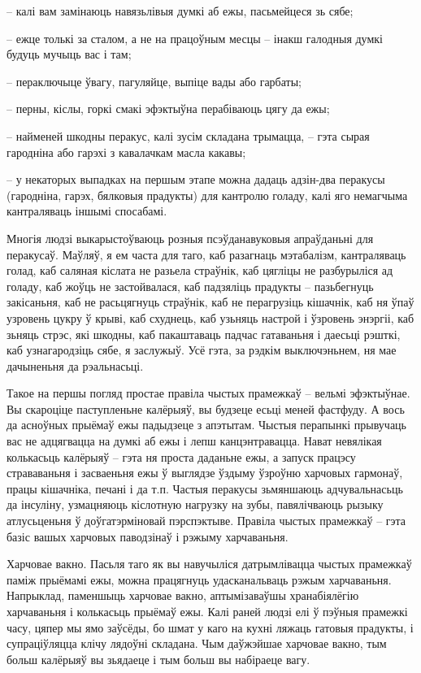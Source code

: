 – калі вам замінаюць навязьлівыя думкі аб ежы, пасьмейцеся зь сябе;

– ежце толькі за сталом, а не на працоўным месцы – інакш галодныя думкі будуць мучыць вас і там;

– пераключыце ўвагу, пагуляйце, выпіце вады або гарбаты;

– перны, кіслы, горкі смакі эфэктыўна перабіваюць цягу да ежы;

– найменей шкодны перакус, калі зусім складана трымацца, – гэта сырая гародніна або гарэхі з кавалачкам масла какавы;

– у некаторых выпадках на першым этапе можна дадаць адзін-два перакусы (гародніна, гарэх, бялковыя прадукты) для кантролю голаду, калі яго немагчыма кантраляваць іншымі спосабамі.

Многія людзі выкарыстоўваюць розныя псэўданавуковыя апраўданьні для перакусаў. Маўляў, я ем часта для таго, каб разагнаць мэтабалізм, кантраляваць голад, каб саляная кіслата не разьела страўнік, каб цягліцы не разбурыліся ад голаду, каб жоўць не застойвалася, каб падзяліць прадукты – пазьбегнуць закісаньня, каб не расьцягнуць страўнік, каб не перагрузіць кішачнік, каб ня ўпаў узровень цукру ў крыві, каб схуднець, каб узьняць настрой і ўзровень энэргіі, каб зьняць стрэс, які шкодны, каб пакаштаваць падчас гатаваньня і даесьці рэшткі, каб узнагародзіць сябе, я заслужыў. Усё гэта, за рэдкім выключэньнем, ня мае дачыненьня да рэальнасьці.

Такое на першы погляд простае правіла чыстых прамежкаў – вельмі эфэктыўнае. Вы скароціце паступленьне калёрыяў, вы будзеце есьці меней фастфуду. А вось да асноўных прыёмаў ежы падыдзеце з апэтытам. Чыстыя перапынкі прывучаць вас не адцягвацца на думкі аб ежы і лепш канцэнтравацца. Нават невялікая колькасьць калёрыяў – гэта ня проста даданьне ежы, а запуск працэсу страваваньня і засваеньня ежы ў выглядзе ўздыму ўзроўню харчовых гармонаў, працы кішачніка, печані і да т.п. Частыя перакусы зьмяншаюць адчувальнасьць да інсуліну, узмацняюць кіслотную нагрузку на зубы, павялічваюць рызыку атлусьценьня ў доўгатэрміновай пэрспэктыве. Правіла чыстых прамежкаў – гэта базіс вашых харчовых паводзінаў і рэжыму харчаваньня.

Харчовае вакно. Пасьля таго як вы навучыліся датрымлівацца чыстых прамежкаў паміж прыёмамі ежы, можна працягнуць удасканальваць рэжым харчаваньня. Напрыклад, паменшыць харчовае вакно, аптымізаваўшы хранабіялёгію харчаваньня і колькасьць прыёмаў ежы. Калі раней людзі елі ў пэўныя прамежкі часу, цяпер мы ямо заўсёды, бо шмат у каго на кухні ляжаць гатовыя прадукты, і супраціўляцца клічу лядоўні складана. Чым даўжэйшае харчовае вакно, тым больш калёрыяў вы зьядаеце і тым больш вы набіраеце вагу.

